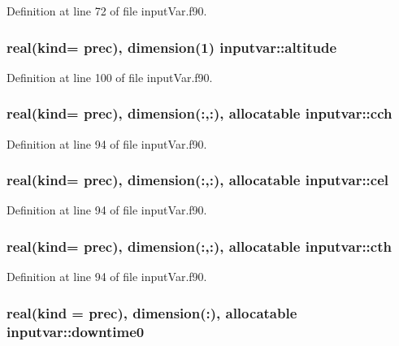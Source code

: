 Definition at line 72 of file input\-Var.\-f90.

\hypertarget{classinputvar_a3f078edd3f3cfd59802ac6321ad3b837}{
\subsubsection[{altitude}]{\setlength{\rightskip}{0pt plus 5cm}real(kind= prec), dimension(1) inputvar\-::altitude}}\label{classinputvar_a3f078edd3f3cfd59802ac6321ad3b837}


Definition at line 100 of file input\-Var.\-f90.

\hypertarget{classinputvar_a88bb670dc0bca944104c292071818a36}{
\subsubsection[{cch}]{\setlength{\rightskip}{0pt plus 5cm}real(kind= prec), dimension(\-:,\-:), allocatable inputvar\-::cch}}\label{classinputvar_a88bb670dc0bca944104c292071818a36}


Definition at line 94 of file input\-Var.\-f90.

\hypertarget{classinputvar_aae07469e8800dce385d02a73306d320c}{
\subsubsection[{cel}]{\setlength{\rightskip}{0pt plus 5cm}real(kind= prec), dimension(\-:,\-:), allocatable inputvar\-::cel}}\label{classinputvar_aae07469e8800dce385d02a73306d320c}


Definition at line 94 of file input\-Var.\-f90.

\hypertarget{classinputvar_adcb3f28e49daee36d91bc87941f486c9}{
\subsubsection[{cth}]{\setlength{\rightskip}{0pt plus 5cm}real(kind= prec), dimension(\-:,\-:), allocatable inputvar\-::cth}}\label{classinputvar_adcb3f28e49daee36d91bc87941f486c9}


Definition at line 94 of file input\-Var.\-f90.

\hypertarget{classinputvar_aaab84ab253f188eacce25a200a4ab300}{
\subsubsection[{downtime0}]{\setlength{\rightskip}{0pt plus 5cm}real(kind = prec), dimension(\-:), allocatable inputvar\-::downtime0}}\label{classinputvar_aaab84ab253f188eacce25a200a4ab300}


